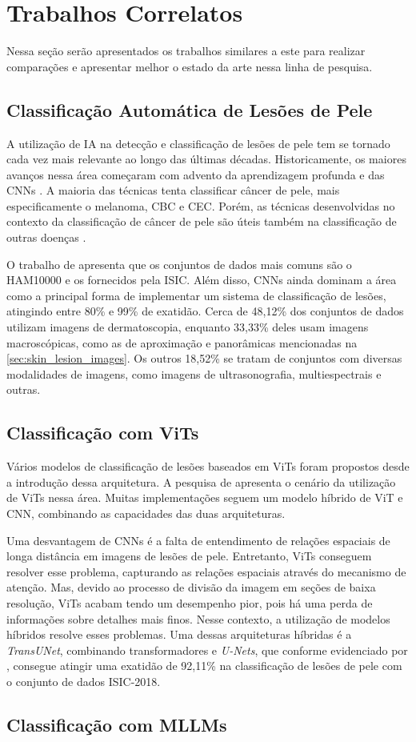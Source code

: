 \chapter{Trabalhos Correlatos}

Nessa seção serão apresentados os trabalhos similares a este para realizar comparações e apresentar melhor o estado da arte nessa linha de pesquisa.

\section{Classificação Automática de Lesões de Pele}

A utilização de \ac{IA} na detecção e classificação de lesões de pele tem se tornado cada vez mais relevante ao longo das últimas décadas. Historicamente, os maiores
avanços nessa área começaram com advento da aprendizagem profunda e das \acp{CNN} \cite{li2019artificial}. A maioria das técnicas tenta classificar câncer de pele, mais
especificamente o melanoma, \ac{CBC} e \ac{CEC}. Porém, as técnicas desenvolvidas no contexto da classificação de câncer de pele são úteis também na classificação de
outras doenças \cite{okuboyejo2018review}.

O trabalho de \textcite{skin_cancer_ai} apresenta que os conjuntos de dados mais comuns são o HAM10000 e os fornecidos pela \ac{ISIC}. Além disso, \acp{CNN} ainda dominam
a área como a principal forma de implementar um sistema de classificação de lesões, atingindo entre 80\% e 99\% de exatidão. Cerca de 48,12\% dos conjuntos de
dados utilizam imagens de dermatoscopia, enquanto 33,33\% deles usam imagens macroscópicas, como as de aproximação e panorâmicas mencionadas na
\autoref{sec:skin_lesion_images}. Os outros 18,52\% se tratam de conjuntos com diversas modalidades de imagens, como imagens de ultrasonografia, multiespectrais e outras.

\section{Classificação com ViTs}

Vários modelos de classificação de lesões baseados em \acp{ViT} foram propostos desde a introdução dessa arquitetura. A pesquisa de \textcite{khan2023identifying}
apresenta o cenário da utilização de \acp{ViT} nessa área. Muitas implementações seguem um modelo híbrido de \ac{ViT} e \ac{CNN}, combinando as capacidades das duas
arquiteturas.

Uma desvantagem de \acp{CNN} é a falta de entendimento de relações espaciais de longa distância em imagens de lesões de pele. Entretanto, \acp{ViT} conseguem resolver
esse problema, capturando as relações espaciais através do mecanismo de atenção. Mas, devido ao processo de divisão da imagem em seções de baixa resolução, \acp{ViT}
acabam tendo um desempenho pior, pois há uma perda de informações sobre detalhes mais finos. Nesse contexto, a utilização de modelos híbridos resolve esses problemas.
Uma dessas arquiteturas híbridas é a \textit{TransUNet}, combinando transformadores e \textit{U-Nets}, que conforme evidenciado por \textcite{gulzar2022skin}, consegue
atingir uma exatidão de 92,11\% na classificação de lesões de pele com o conjunto de dados \ac{ISIC}-2018.

\section{Classificação com MLLMs}